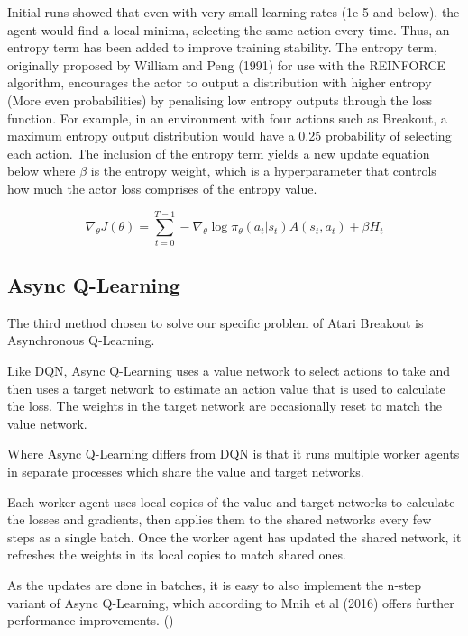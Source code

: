 \documentclass{article}
\begin{document}
Initial runs showed that even with very small learning rates (1e-5 and below), the agent would find a local minima, selecting the same action every time. Thus, an entropy term has been added to improve training stability. The entropy term, originally proposed by William and Peng (1991) for use with the REINFORCE algorithm, encourages the actor to output a distribution with higher entropy (More even probabilities) by penalising low entropy outputs through the loss function. For example, in an environment with four actions such as Breakout, a maximum entropy output distribution would have a 0.25 probability of selecting each action. The inclusion of the entropy term yields a new update equation below where  $\beta$ is the entropy weight, which is a hyperparameter that controls how much the actor loss comprises of the entropy value.

\begin{equation}
\nabla_{\theta} J(\theta) = \sum_{t=0}^{T-1}-\nabla_{\theta}\log{\pi_{\theta}}(a_{t} | s_{t}) A(s_{t}, a_{t}) + \beta H_{t}
\end{equation}

\subsection{Async Q-Learning}

The third method chosen to solve our specific problem of Atari Breakout is Asynchronous Q-Learning.

Like DQN, Async Q-Learning uses a value network to select actions to take and then uses a target network to estimate an action value that is used to calculate the loss. The weights in the target network are occasionally reset to match the value network.

Where Async Q-Learning differs from DQN is that it runs multiple worker agents in separate processes which share the value and target networks.

Each worker agent uses local copies of the value and target networks to calculate the losses and gradients, then applies them to the  shared networks every few steps as a single batch.
Once the worker agent has updated the shared network, it refreshes the weights in its local copies to match shared ones.

As the updates are done in batches, it is easy to also implement the n-step variant of Async Q-Learning, which according to Mnih et al (2016) offers further performance improvements. ()
\end{document}
